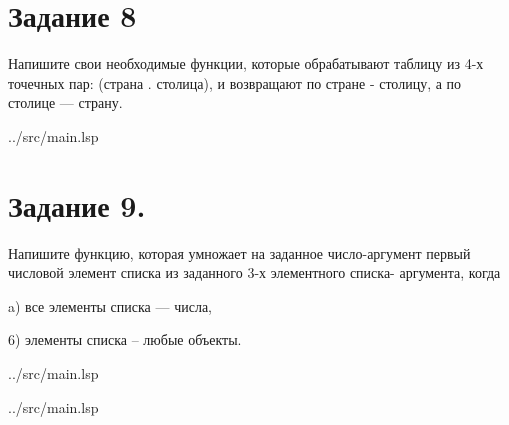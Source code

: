 \section*{Задание 8}
Напишите свои необходимые функции, которые обрабатывают таблицу из 4-х точечных пар: (страна . столица), и возвращают по стране - столицу, а по столице — страну.

\begin{lstinputlisting}[
	caption={Задание 8, IF},
	label={lst:t8},
	style={lsp},
	linerange={149-155},
	]{../src/main.lsp}
\end{lstinputlisting}

\section*{Задание 9.}
Напишите функцию, которая умножает на заданное число-аргумент 
первый числовой элемент списка из заданного 3-х элементного списка-
аргумента, когда

a) все элементы списка --- числа,

6) элементы списка -- любые объекты.


\begin{lstinputlisting}[
	caption={Задание 9, a},
	label={lst:t9-1},
	style={lsp},
	linerange={157-171},
	]{../src/main.lsp}
\end{lstinputlisting}

\begin{lstinputlisting}[
	caption={Задание 9, b},
	label={lst:t9-1},
	style={lsp},
	linerange={173-179},
	]{../src/main.lsp}
\end{lstinputlisting}
